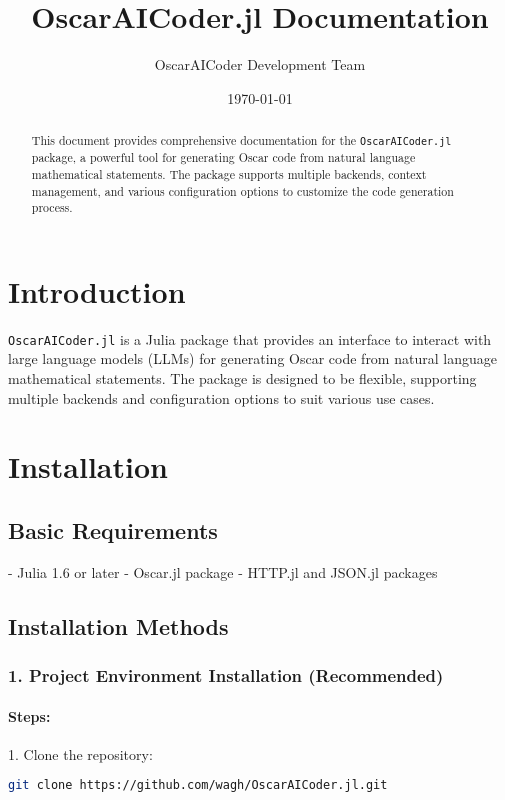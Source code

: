 \documentclass[11pt,a4paper]{article}
\title{OscarAICoder.jl Documentation}
\author{OscarAICoder Development Team}
\date{\today}
\newcommand{\modname}[1]{\texttt{#1}}
\begin{document}
\maketitle
\thispagestyle{empty}

\begin{abstract}
  This document provides comprehensive documentation for the
  \modname{OscarAICoder.jl} package, a powerful tool for generating Oscar
  \cite{oscar_project} code from natural language mathematical statements. The
  package supports multiple backends, context management, and various
  configuration options to customize the code generation process.
\end{abstract}

\section{Introduction}
\label{sec:introduction}

\modname{OscarAICoder.jl} is a Julia package that provides an interface to interact with large language models (LLMs) for generating Oscar code from natural language mathematical statements. The package is designed to be flexible, supporting multiple backends and configuration options to suit various use cases.

\section{Installation}
\label{sec:installation}

\subsection{Basic Requirements}
- Julia 1.6 or later
- Oscar.jl package
- HTTP.jl and JSON.jl packages

\subsection{Installation Methods}

\subsubsection{1. Project Environment Installation (Recommended)}

\paragraph{Steps:}
1. Clone the repository:
\begin{lstlisting}[language=bash]
git clone https://github.com/wagh/OscarAICoder.jl.git
\end{lstlisting}
\end{document}
